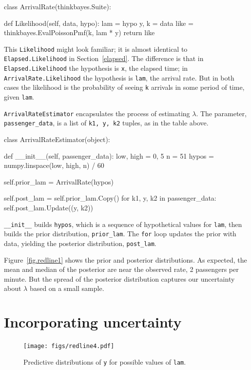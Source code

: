 \documentclass[12pt]{book}
\theoremstyle{exercise}
\begin{document}
\begin{code}
class ArrivalRate(thinkbayes.Suite):

    def Likelihood(self, data, hypo):
        lam = hypo
        y, k = data
        like = thinkbayes.EvalPoissonPmf(k, lam * y)
        return like
\end{code}

This {\tt Likelihood} might look familiar; it
is almost identical to {\tt Elapsed.Likelihood} in
Section~\ref{elapsed}.  The difference is that in {\tt
  Elapsed.Likelihood} the hypothesis is {\tt x}, the elapsed time; in
{\tt ArrivalRate.Likelihood} the hypothesis is {\tt lam}, the arrival
rate.  But in both cases the likelihood is the probability of seeing
{\tt k} arrivals in some period of time, given {\tt lam}.

{\tt ArrivalRateEstimator} encapsulates the process of estimating
$\lambda$.  The parameter, \verb"passenger_data", is a list
of {\tt k1, y, k2} tuples, as in the table above.

\begin{code}
class ArrivalRateEstimator(object):

    def __init__(self, passenger_data):
        low, high = 0, 5
        n = 51
        hypos = numpy.linspace(low, high, n) / 60

        self.prior_lam = ArrivalRate(hypos)

        self.post_lam = self.prior_lam.Copy()
        for k1, y, k2 in passenger_data:
            self.post_lam.Update((y, k2))
\end{code}

\verb"__init__" builds
{\tt hypos}, which is a sequence of hypothetical values for {\tt lam},
then builds the prior distribution, \verb"prior_lam".
The {\tt for} loop updates the prior with data, yielding the posterior
distribution, \verb"post_lam".

Figure~\ref{fig.redline1} shows
the prior and posterior distributions.  As expected, the mean and
median of the posterior are near the observed rate, 2 passengers per
minute.  But the spread of the posterior distribution captures our
uncertainty about $\lambda$ based on a small sample.


\section{Incorporating uncertainty}

\begin{figure}
\centerline{\texttt{[image: figs/redline4.pdf]}}
\caption{Predictive distributions of {\tt y} for possible values
  of {\tt lam}. }
\label{fig.redline4}
\end{figure}
\end{document}
